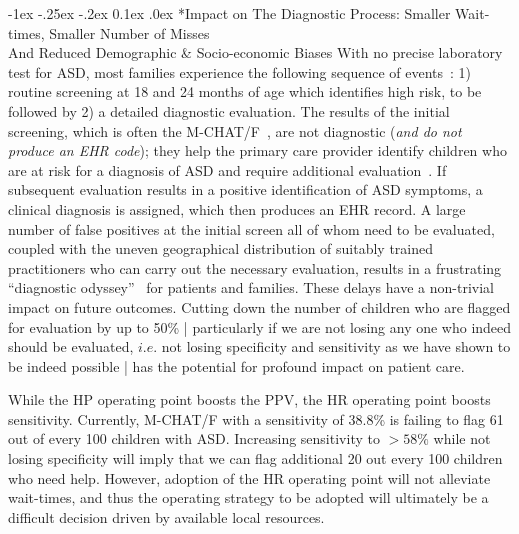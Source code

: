 \documentclass[onecolumn,,10pt]{IEEEtran}
\makeatletter
\renewcommand\subsection{\@startsection {section}{1}{\z@}%
  {-1ex \@plus -.25ex \@minus -.2ex}%
  {0.1ex \@plus.0ex}%
  {\fontsize{11}{12}\selectfont\bfseries\sffamily\color{DodgerBlue4}}}
\makeatother
\begin{document}
\subsection*{Impact on The Diagnostic Process: Smaller Wait-times, Smaller Number of  Misses \\ And Reduced Demographic \& Socio-economic Biases} 
%
With no precise laboratory  test for ASD, most families experience the following sequence of events~\cite{gordon2016whittling,penner2018practice,hyman2020identification}: 1) routine screening at 18 and 24 months of age which identifies high risk, to be followed by 2) a detailed diagnostic evaluation.%
The  results of the initial screening, which is often the M-CHAT/F~\cite{robins2014validation,hyman2020identification},   are not
diagnostic (\textit{and  do not produce an EHR code}); they help the primary care   
provider identify children who are at
risk for a diagnosis of ASD and
require additional evaluation~\cite{penner2018practice}. If subsequent evaluation results in a positive identification of ASD symptoms,  a clinical diagnosis is assigned, which then produces  an EHR record. A large number of false positives at the initial screen   all of whom need to be evaluated, coupled with the uneven geographical distribution of suitably trained practitioners  who can  carry out the necessary evaluation, results in a frustrating ``diagnostic odyssey''~\cite{gordon2016whittling} for patients and families. These delays have a non-trivial impact on future outcomes. Cutting down the number of children who are flagged for  evaluation by up to 50\% | particularly if we are not losing any one who indeed should be evaluated, $i.e.$ not losing specificity and sensitivity as we have shown to be indeed  possible | has the potential for profound impact on patient care.

While the HP operating point boosts the PPV, the HR operating point boosts sensitivity. Currently, M-CHAT/F with  a sensitivity of 38.8\% is failing to flag 61 out of every 100 children with ASD. Increasing sensitivity to $>58\%$ while not losing specificity will imply that we can flag additional 20 out every  100 children who need help. However, adoption of the HR operating point will not alleviate wait-times, and thus the  operating strategy to be  adopted  will ultimately be a difficult decision driven by available local resources. 
\end{document}
